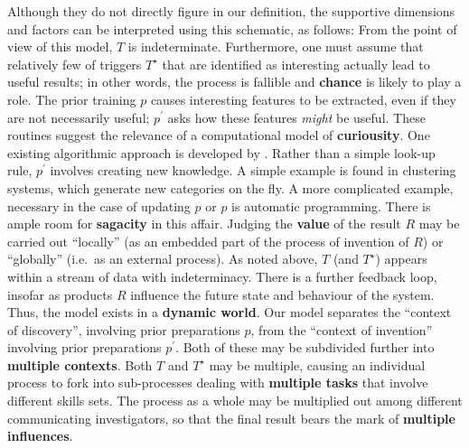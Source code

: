 Although they do not directly figure in our definition, the supportive
dimensions and factors can be interpreted using this schematic, as
follows:
%
From the point of view of this model, $T$ is indeterminate.
Furthermore, one must assume that relatively few of triggers $T^\star$
that are identified as interesting actually lead to useful results; in
other words, the process is fallible and \textbf{chance} is likely to
play a role.
%
The prior training $p$ causes interesting features
to be extracted, even if they are not necessarily useful; $p^{\prime}$
asks how these features \emph{might} be useful.  These routines 
suggest the relevance of a computational model of \textbf{curiousity}.  One existing algorithmic approach is developed by .
%
Rather than a simple look-up rule, $p^{\prime}$ involves creating new knowledge.  A simple example is found in clustering systems, which generate new categories on the fly.  A more complicated example, necessary in the case of updating $p$ or $p$ is automatic programming.  There is ample room for \textbf{sagacity} in this affair.
%
Judging the \textbf{value} of the result $R$ may be carried out
``locally'' (as an embedded part of the process of invention of $R$)
or ``globally'' (i.e.~as an external process).
%
As noted above, $T$ (and $T^\star$) appears within a stream of data
with indeterminacy.  There is a further feedback loop, insofar as
products $R$ influence the future state and behaviour of the system.
Thus, the model exists in a \textbf{dynamic world}.
%
Our model separates the
``context of discovery'', involving prior preparations $p$, from the
``context of invention'' involving prior preparations $p^{\prime}$.
Both of these may be subdivided further into \textbf{multiple contexts}. 
%
Both $T$ and $T^\star$ may be multiple, causing an individual process
to fork into sub-processes dealing with \textbf{multiple tasks} that
involve different skills sets.
%
The process as a whole may be multiplied out among different
communicating investigators, so that the final result bears the mark
of \textbf{multiple influences}.




